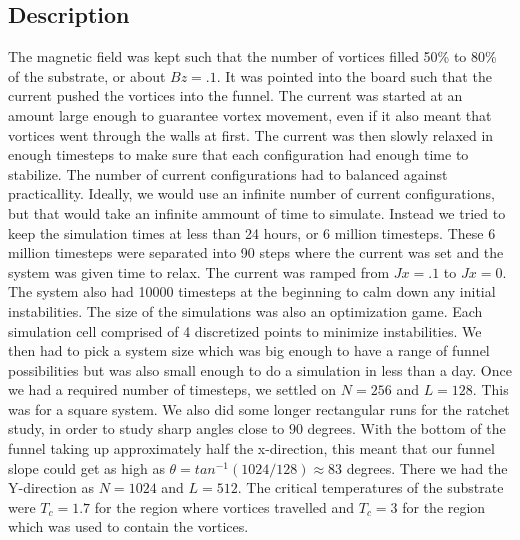 \subsection{Description}
The magnetic field was kept such that the number of vortices filled 50\% to 80\% of the substrate, or about $Bz=.1$. It was pointed into the board such that the current pushed the vortices into the funnel. The current was started at an amount large enough to guarantee vortex movement, even if it also meant that vortices went through the walls at first. The current was then slowly relaxed in enough timesteps to make sure that each configuration had enough time to stabilize. The number of current configurations had to balanced against practicallity. Ideally, we would use an infinite number of current configurations, but that would take an infinite ammount of time to simulate. Instead we tried to keep the simulation times at less than 24 hours, or 6 million timesteps. These 6 million timesteps were separated into 90 steps where the current was set and the system was given time to relax. The current was ramped from $Jx = .1$ to $Jx = 0$. The system also had 10000 timesteps at the beginning to calm down any initial instabilities. The size of the simulations was also an optimization game. Each simulation cell comprised of 4 discretized points to minimize instabilities. We then had to pick a system size which was big enough to have a range of funnel possibilities but was also small enough to do a simulation in less than a day. Once we had a required number of timesteps, we settled on $N=256$ and $L=128$. This was for a square system. We also did some longer rectangular runs for the ratchet study, in order to study sharp angles close to $90$ degrees. With the bottom of the funnel taking up approximately half the x-direction, this meant that our funnel slope could get as high as $\theta = tan^{-1}(1024/128) \approx 83$ degrees. There we had the Y-direction as $N=1024$ and $L=512$.  The critical temperatures of the substrate were $T_c=1.7$ for the region where vortices travelled and $T_c=3$ for the region which was used to contain the vortices.

